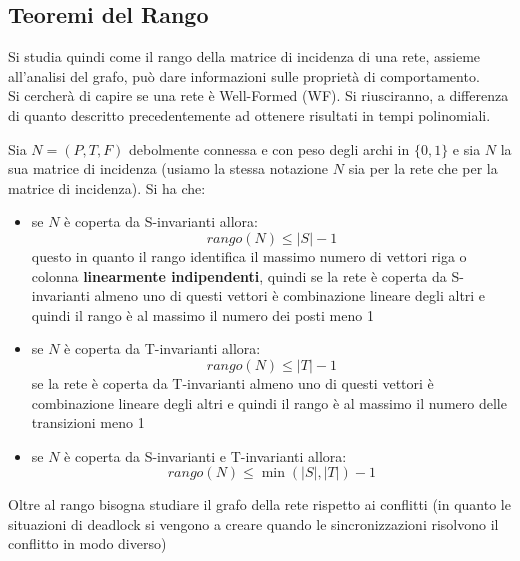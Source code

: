 \documentclass[a4paper,12pt, oneside]{book}
\begin{document}
\subsection{Teoremi del Rango}
Si studia quindi come il rango della matrice di incidenza di una rete, assieme
all'analisi del grafo, può dare informazioni sulle proprietà di comportamento.\\
Si cercherà di capire se una rete è Well-Formed (WF). Si riusciranno, a
differenza di quanto descritto precedentemente ad ottenere risultati in tempi
polinomiali.  
\begin{teorema}
  Sia $N = (P, T , F )$ debolmente connessa e con peso degli archi in $\{0, 1\}$ e
  sia $N$ la sua matrice di incidenza (usiamo la stessa notazione $N$ sia per la
  rete che per la matrice di incidenza). Si ha che:
  \begin{itemize}
    \item se $N$ è coperta da S-invarianti allora:
    \[rango(N) \leq |S| − 1\]
    questo in quanto il rango identifica il massimo numero di vettori riga o
    colonna \textbf{linearmente indipendenti}, quindi se la rete è coperta da
    S-invarianti almeno uno di questi vettori è combinazione lineare degli altri e
    quindi il rango è al massimo il numero dei posti meno 1
    \item se $N$ è coperta da T-invarianti allora:
    \[rango(N) \leq |T| − 1\]
    se la rete è coperta da T-invarianti almeno uno di questi vettori è
    combinazione lineare degli altri e quindi il rango è al massimo il numero
    delle transizioni meno 1
    \item se $N$ è coperta da S-invarianti e T-invarianti allora:
    \[rango(N) \leq  \min(|S|, |T|) − 1\]
  \end{itemize}
  Oltre al rango bisogna studiare il grafo della rete rispetto ai conflitti (in
  quanto le situazioni di deadlock si vengono a creare quando le sincronizzazioni
  risolvono il conflitto in modo diverso)
\end{teorema}
\end{document}
